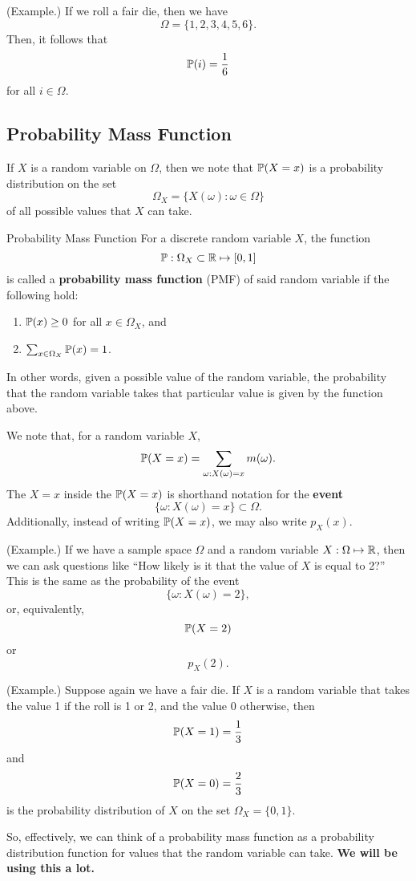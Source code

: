 \begin{mdframed}[]
    (Example.) If we roll a fair die, then we have 
    \[\Omega = \{1, 2, 3, 4, 5, 6\}.\]
    Then, it follows that 
    \[\mathbb{P}(i) = \frac{1}{6}\]
    for all $i \in \Omega$. 
\end{mdframed}

\subsection{Probability Mass Function}
If $X$ is a random variable on $\Omega$, then we note that $\mathbb{P}(X = x)$ is a probability distribution on the set 
\[\Omega_{X} = \{X(\omega) : \omega \in \Omega\}\]
of all possible values that $X$ can take. 
\begin{definition}{Probability Mass Function}{}
    For a discrete random variable $X$, the function 
    \[\mathbb{P}: \Omega_{X} \subset \mathbb{R} \mapsto [0, 1]\]
    is called a \textbf{probability mass function} (PMF) of said random variable if the following hold: 
    \begin{enumerate}
        \item $\mathbb{P}(x) \geq 0$ for all $x \in \Omega_{X}$, and 
        \item $\sum_{x \in \Omega_{X}} \mathbb{P}(x) = 1$. 
    \end{enumerate}
    In other words, given a possible value of the random variable, the probability that the random variable takes that particular value is given by the function above. 
\end{definition}
We note that, for a random variable $X$,
\[\mathbb{P}(X = x) = \sum_{\omega : X(\omega) = x} m(\omega).\]
The $X = x$ inside the $\mathbb{P}(X = x)$ is shorthand notation for the \textbf{event} 
\[\{\omega : X(\omega) = x\} \subset \Omega.\]
Additionally, instead of writing $\mathbb{P}(X = x)$, we may also write $p_{X}(x)$. 


\begin{mdframed}[]
    (Example.) If we have a sample space $\Omega$ and a random variable $X: \Omega \mapsto \mathbb{R}$, then we can ask questions like ``How likely is it that the value of $X$ is equal to 2?'' This is the same as the probability of the event 
    \[\{\omega : X(\omega) = 2\},\]
    or, equivalently, 
    \[\mathbb{P}(X = 2)\]
    or 
    \[p_{X}(2).\]
\end{mdframed}

\begin{mdframed}[]
    (Example.) Suppose again we have a fair die. If $X$ is a random variable that takes the value 1 if the roll is 1 or 2, and the value 0 otherwise, then 
    \[\mathbb{P}(X = 1) = \frac{1}{3}\]
    and 
    \[\mathbb{P}(X = 0) = \frac{2}{3}\]
    is the probability distribution of $X$ on the set $\Omega_{X} = \{0, 1\}$. 
\end{mdframed}
So, effectively, we can think of a probability mass function as a probability distribution function for values that the random variable can take. \textbf{We will be using this a lot.}

